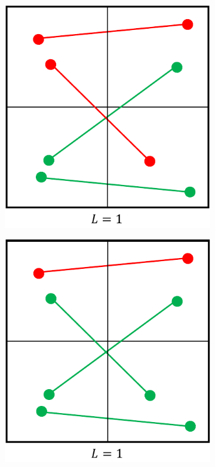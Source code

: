 \documentclass[bachelor,       %
               twoside,        %
               BCOR10mm,       %
               ngerman, english %
               ]{GAUBM}
\begin{document}
\begin{figure}[h]
  \centering
  \begin{subfigure}[b]{0.3\textwidth}
      \centering
      \includegraphics[width=\textwidth]{figures/loss-1.pdf}
      \caption{}
      \label{fig:loss-1}
  \end{subfigure}
    \hfill
  \begin{subfigure}[b]{0.3\textwidth}
      \centering
      \includegraphics[width=\textwidth]{figures/loss-2.pdf}

\end{subfigure}
\end{figure}
\end{document}
